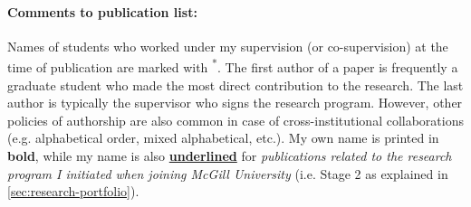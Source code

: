 \paragraph{Comments to publication list:} 
Names of students who worked under my supervision (or co-supervision) at the time of publication are marked with \textsuperscript{*}. The first author of a paper is frequently a graduate student who made the most direct contribution to the research. The last author is typically the supervisor who signs the research program. However, other policies of authorship are also common in case of cross-institutional collaborations (e.g. alphabetical order, mixed alphabetical, etc.). My own name is printed in \textbf{bold}, while my name is also \textbf{\underline{underlined}} for \emph{publications related to the research program I initiated when joining McGill University} (i.e. Stage 2 as explained in \autoref{sec:research-portfolio}). %


